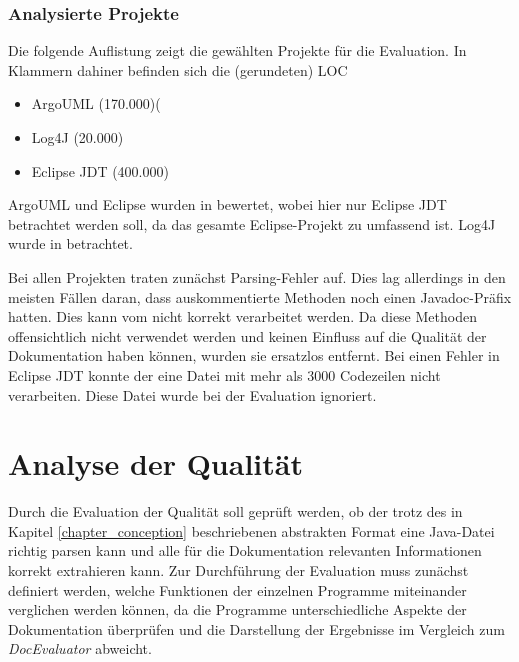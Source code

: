  \subsubsection{Analysierte Projekte}\label{chapter:eval_projects}
 Die folgende Auflistung zeigt die gewählten Projekte für die Evaluation. In Klammern dahiner befinden sich die  (gerundeten) \ac{LOC}
 \begin{itemize}
    \item ArgoUML (170.000)(
     \item Log4J (20.000)
     \item Eclipse \ac{JDT} (400.000)
 \end{itemize}
 
 ArgoUML und Eclipse wurden in \cite[S. 74] {AutomaticQualityAssessmentofSourceCodeComments:TheJavadocMiner} bewertet, wobei hier nur Eclipse \ac{JDT} betrachtet werden soll, da das gesamte Eclipse-Projekt zu umfassend ist. Log4J wurde in \cite[S. 267] {@tComment:TestingJavadocCommentstoDetectComment-CodeInconsistencies} betrachtet. 

 Bei allen Projekten traten zunächst Parsing-Fehler auf. Dies lag allerdings in den meisten Fällen daran, dass auskommentierte Methoden noch einen Javadoc-Präfix hatten. Dies kann vom \doceval nicht korrekt verarbeitet werden. Da diese Methoden offensichtlich nicht verwendet werden und keinen Einfluss auf die Qualität der Dokumentation haben können, wurden sie ersatzlos entfernt. Bei einen Fehler in Eclipse JDT konnte der \doceval eine Datei mit mehr als 3000 Codezeilen nicht verarbeiten. Diese Datei wurde bei der Evaluation ignoriert.
\section{Analyse der Qualität}
Durch die Evaluation der Qualität soll geprüft werden, ob der \doceval trotz des in Kapitel \ref{chapter_conception}
 beschriebenen abstrakten Format eine Java-Datei richtig parsen kann und alle für die Dokumentation relevanten Informationen korrekt extrahieren kann. Zur Durchführung der Evaluation muss zunächst definiert werden, welche Funktionen der einzelnen Programme miteinander verglichen werden können, da die Programme unterschiedliche Aspekte der Dokumentation überprüfen und die Darstellung der Ergebnisse im Vergleich zum \textit{DocEvaluator} abweicht.


